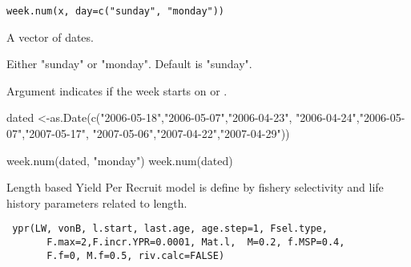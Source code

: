 \documentclass[a4paper]{book}
\begin{document}
%
\begin{Usage}
\begin{verbatim}
week.num(x, day=c("sunday", "monday"))
\end{verbatim}
\end{Usage}
%
\begin{Arguments}
\begin{ldescription}
\item[\code{x}] 
A vector of dates.

\item[\code{day}] 
Either "sunday" or "monday". Default is "sunday".

\end{ldescription}
\end{Arguments}
%
\begin{Details}\relax
Argument  indicates if the week starts on  or .
\end{Details}
%
\begin{Examples}
\begin{ExampleCode}
dated <-as.Date(c("2006-05-18","2006-05-07","2006-04-23",
                  "2006-04-24","2006-05-07","2007-05-17",
                  "2007-05-06","2007-04-22","2007-04-29"))
                  
week.num(dated, "monday")
week.num(dated)
\end{ExampleCode}
\end{Examples}
\newpage
{}
%
\begin{Description}\relax
Length based Yield Per Recruit model is define by fishery selectivity and life history parameters related to length. 


\end{Description}
%
\begin{Usage}
\begin{verbatim}
 ypr(LW, vonB, l.start, last.age, age.step=1, Fsel.type, 
       F.max=2,F.incr.YPR=0.0001, Mat.l,  M=0.2, f.MSP=0.4, 
       F.f=0, M.f=0.5, riv.calc=FALSE)

\end{verbatim}
\end{Usage}
%
\end{document}
